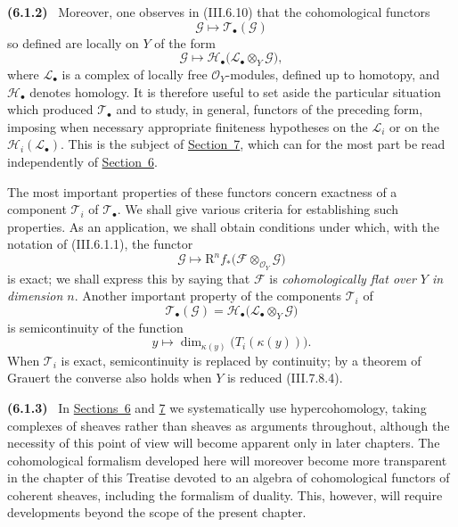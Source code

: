 \documentclass[10pt,oneside]{book}
\newcommand{\sh}[1]{\mathscr{#1}}
\newcommand{\RR}{\mathrm R}
\newcommand{\kres}{\kappa}
\newcommand{\sref}[2][]{(#2)}
\newcommand{\oldpage}[2][]{\setcounter{footnote}{0}\marginpar{\scriptsize\textbf{#1}~|~#2}\ignorespaces}
\newenvironment{env}[1][]{\par\medskip\noindent\textbf{(#1)}\ }{\par}
\begin{document}
\begin{env}[6.1.2]
\label{III.6.1.2}
Moreover, one observes in \sref{III.6.10} that the cohomological
functors
\[
  \sh{G}\longmapsto\sh{T}_\bullet(\sh{G})
\]
so defined are locally on $Y$ of the form
\[
  \sh{G}\longmapsto
  \sh{H}_\bullet\bigl(\sh{L}_\bullet\otimes_Y\sh{G}\bigr),
\]
where $\sh{L}_\bullet$ is a complex of locally free
$\sh{O}_Y$-modules, defined up to homotopy, and
$\sh{H}_\bullet$ denotes homology.  It is therefore useful to set
aside the particular situation which produced
$\sh{T}_\bullet$ and to study, in general,
\oldpage[III]{138}
functors of the preceding form, imposing when necessary appropriate
finiteness hypotheses on the $\sh{L}_i$ or on the
$\sh{H}_i(\sh{L}_\bullet)$.  This is the subject of \hyperref[section:III.7]{Section~7},
which can for the most part be read independently of \hyperref[section:III.6]{Section~6}.

The most important properties of these functors concern exactness
of a component $\sh{T}_i$ of $\sh{T}_\bullet$.  We shall give
various criteria for establishing such properties.  As an
application, we shall obtain conditions under which, with the
notation of \sref{III.6.1.1}, the functor
\[
  \sh{G}\longmapsto
  \RR^n f_*\bigl(\sh{F}\otimes_{\sh{O}_Y}\sh{G}\bigr)
\]
is exact; we shall express this by saying that $\sh{F}$ is
\emph{cohomologically flat over $Y$ in dimension $n$}.
Another important property of the components $\sh{T}_i$ of
\[
  \sh{T}_\bullet(\sh{G})
  =
  \sh{H}_\bullet\bigl(\sh{L}_\bullet\otimes_Y\sh{G}\bigr)
\]
is semicontinuity of the function
\[
  y\longmapsto
  \dim_{\kres(y)}\bigl(T_i(\kres(y))\bigr).
\]
When $\sh{T}_i$ is exact, semicontinuity is replaced by continuity;
by a theorem of Grauert the converse also holds when $Y$ is reduced
\sref{III.7.8.4}.
\end{env}

\begin{env}[6.1.3]
\label{III.6.1.3}
In \hyperref[section:III.6]{Sections~6} and \hyperref[section:III.7]{7} we systematically use hypercohomology, taking
complexes of sheaves rather than sheaves as arguments throughout,
although the necessity of this point of view will become apparent
only in later chapters.  The cohomological formalism developed here
will moreover become more transparent in the chapter of this
Treatise devoted to an algebra of cohomological functors of coherent
sheaves, including the formalism of duality.  This, however, will
require developments beyond the scope of the present chapter.
\end{env}
\end{document}
